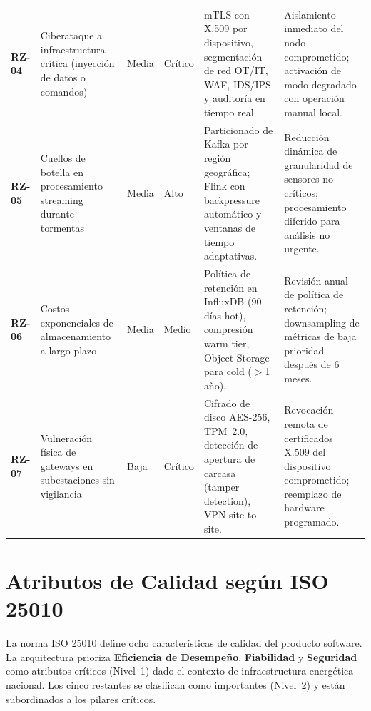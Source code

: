 \documentclass[12pt, letterpaper]{article}
\begin{document}
\begin{longtable}{
  C{1.2cm}
  P{2.8cm}
  C{1.2cm}
  C{1.4cm}
  P{3.6cm}
  P{3.5cm}
}
\textbf{RZ-04} &
  Ciberataque a infraestructura crítica (inyección de datos o comandos) &
  Media & Crítico &
  mTLS con X.509 por dispositivo, segmentación de red OT/IT, WAF, IDS/IPS y
  auditoría en tiempo real. &
  Aislamiento inmediato del nodo comprometido; activación de modo degradado con
  operación manual local. \\

\textbf{RZ-05} &
  Cuellos de botella en procesamiento streaming durante tormentas &
  Media & Alto &
  Particionado de Kafka por región geográfica; Flink con backpressure automático y
  ventanas de tiempo adaptativas. &
  Reducción dinámica de granularidad de sensores no críticos; procesamiento diferido
  para análisis no urgente. \\

\textbf{RZ-06} &
  Costos exponenciales de almacenamiento a largo plazo &
  Media & Medio &
  Política de retención en InfluxDB (90 días hot), compresión warm tier, Object
  Storage para cold ($>$1 año). &
  Revisión anual de política de retención; downsampling de métricas de baja prioridad
  después de 6 meses. \\

\textbf{RZ-07} &
  Vulneración física de gateways en subestaciones sin vigilancia &
  Baja & Crítico &
  Cifrado de disco AES-256, TPM~2.0, detección de apertura de carcasa (tamper
  detection), VPN site-to-site. &
  Revocación remota de certificados X.509 del dispositivo comprometido; reemplazo de
  hardware programado. \\

\end{longtable}
\section{Atributos de Calidad según ISO 25010}

La norma ISO 25010 define ocho características de calidad del producto software. La
arquitectura prioriza \textbf{Eficiencia de Desempeño}, \textbf{Fiabilidad} y
\textbf{Seguridad} como atributos críticos (Nivel~1) dado el contexto de infraestructura
energética nacional. Los cinco restantes se clasifican como importantes (Nivel~2) y están
subordinados a los pilares críticos.
\end{document}
